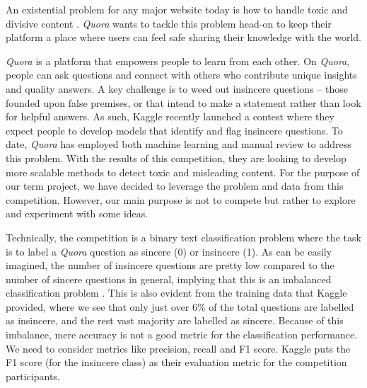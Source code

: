 \documentclass[11pt,twocolumn,letterpaper]{article}
\begin{document}
An existential problem for any major website today is how to handle toxic and divisive content \cite{Kaggle1}. \textit{Quora} wants to tackle this problem head-on to keep their platform a place where users can feel safe sharing their knowledge with the world.

 \textit{Quora} \cite{Quora} is a platform that empowers people to learn from each other. On \textit{Quora}, people can ask questions and connect with others who contribute unique insights and quality answers. A key challenge is to weed out insincere questions -- those founded upon false premises, or that intend to make a statement rather than look for helpful answers. As such, Kaggle recently launched a contest where they expect people to develop models that identify and flag insincere questions. To date, \textit{Quora} has employed both machine learning and manual review to address this problem. With the results of this competition, they are looking to develop more scalable methods to detect toxic and misleading content. For the purpose of our term project, we have decided to leverage the problem and data from this competition. However, our main purpose is not to compete but rather to explore and experiment with some ideas. 
 
Technically, the competition is a binary text classification problem where the task is to label a \textit{Quora} question as sincere (0) or insincere (1). As can be easily imagined, the number of insincere questions are pretty low compared to the number of sincere questions in general, implying that this is an imbalanced classification problem \cite{Imbalanced1}. This is also evident from the training data that Kaggle provided, where we see that only just over 6\% of the  total questions are labelled as insincere, and the rest vast majority are labelled as sincere. Because of this imbalance, mere accuracy is not a good metric for the classification performance. We need to consider  metrics like precision, recall and F1 score. Kaggle puts the F1 score (for the insincere class) as their evaluation metric for the competition participants.
\end{document}
